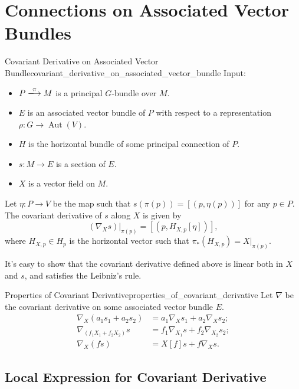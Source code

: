 \documentclass{article}
\begin{document}
\section{Connections on Associated Vector Bundles}

\begin{definition}{Covariant Derivative on Associated Vector Bundle}{covariant_derivative_on_associated_vector_bundle}
    Input:
    \begin{itemize}
        \item $P\xlongrightarrow{\pi} M$ is a principal $G$-bundle over $M$.
        \item $E$ is an associated vector bundle of $P$ with respect to a representation $\rho: G\rightarrow \operatorname{Aut}(V)$.
        \item $H$ is the horizontal bundle of some principal connection of $P$.
        \item $s: M \rightarrow E$ is a section of $E$.
        \item $X$ is a vector field on $M$.
    \end{itemize}
    Let $\eta: P \rightarrow V$ be the map such that $s(\pi(p)) = [(p, \eta(p))]$ for any $p\in P$.
    The covariant derivative of $s$ along $X$ is given by
    \[ (\nabla_X s)\vert_{\pi(p)} = [(p, H_{X,p}[\eta])], \]
    where $H_{X,p} \in H_p$ is the horizontal vector such that $\pi_*(H_{X,p}) = X\vert_{\pi(p)}$.
\end{definition}

It's easy to show that the covariant derivative defined above is linear both in $X$ and $s$, and satisfies the Leibniz's rule.
\begin{proposition}{Properties of Covariant Derivative}{properties_of_covariant_derivative}
    Let $\nabla$ be the covariant derivative on some associated vector bundle $E$.
    \begin{align*}
        \nabla_X(a_1 s_1 + a_2 s_2) &= a_1 \nabla_X s_1 + a_2 \nabla_X s_2; \\
        \nabla_{(f_1 X_1 + f_2 X_2)} s &= f_1 \nabla_{X_1} s + f_2\nabla_{X_2} s_2; \\
        \nabla_{X} (fs) &= X[f]s + f\nabla_{X} s.
    \end{align*}
\end{proposition}

\subsection{Local Expression for Covariant Derivative}
\end{document}
